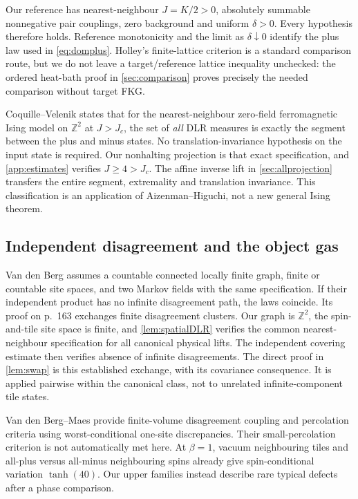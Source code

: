 \documentclass[11pt,reqno]{amsart}
\numberwithin{equation}{section}
\theoremstyle{definition}
\theoremstyle{remark}
\newcommand{\Z}{\mathbb Z}
\begin{document}
Our reference has nearest-neighbour $J=K/2>0$, absolutely summable nonnegative pair couplings, zero background and uniform $\delta>0$. Every hypothesis therefore holds. Reference monotonicity and the limit as $\delta\downarrow0$ identify the plus law used in \eqref{eq:domplus}. Holley's finite-lattice criterion \cite{Holley1974} is a standard comparison route, but we do not leave a target/reference lattice inequality unchecked: the ordered heat-bath proof in \cref{sec:comparison} proves precisely the needed comparison without target FKG.

Coquille--Velenik \cite[Corollary~1.1]{CoquilleVelenik2012} states that for the nearest-neighbour zero-field ferromagnetic Ising model on $\Z^2$ at $J>J_c$, the set of \emph{all} DLR measures is exactly the segment between the plus and minus states. No translation-invariance hypothesis on the input state is required. Our nonhalting projection is that exact specification, and \cref{app:estimates} verifies $J\geq4>J_c$. The affine inverse lift in \cref{sec:allprojection} transfers the entire segment, extremality and translation invariance. This classification is an application of Aizenman--Higuchi, not a new general Ising theorem.

\subsection{Independent disagreement and the object gas}
Van den Berg \cite[Theorem~1, p.~162]{VanDenBerg1993} assumes a countable connected locally finite graph, finite or countable site spaces, and two Markov fields with the same specification. If their independent product has no infinite disagreement path, the laws coincide. Its proof on p.~163 exchanges finite disagreement clusters. Our graph is $\Z^2$, the spin-and-tile site space is finite, and \cref{lem:spatialDLR} verifies the common nearest-neighbour specification for all canonical physical lifts. The independent covering estimate then verifies absence of infinite disagreements. The direct proof in \cref{lem:swap} is this established exchange, with its covariance consequence. It is applied pairwise within the canonical class, not to unrelated infinite-component tile states.

Van den Berg--Maes \cite[Theorem~1 and Corollaries~1--2]{VanDenBergMaes1994} provide finite-volume disagreement coupling and percolation criteria using worst-conditional one-site discrepancies. Their small-percolation criterion is not automatically met here. At $\beta=1$, vacuum neighbouring tiles and all-plus versus all-minus neighbouring spins already give spin-conditional variation $\tanh(40)$. Our upper families instead describe rare typical defects after a phase comparison.
\end{document}

